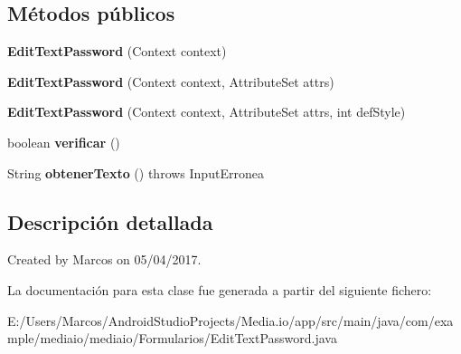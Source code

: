 \subsection*{Métodos públicos}
\begin{DoxyCompactItemize}
\item 
\mbox{\label{classcom_1_1example_1_1mediaio_1_1mediaio_1_1_formularios_1_1_edit_text_password_a96dba8342aa6e151d35646019243f469}} 
{\bfseries Edit\+Text\+Password} (Context context)
\item 
\mbox{\label{classcom_1_1example_1_1mediaio_1_1mediaio_1_1_formularios_1_1_edit_text_password_af9ffd043b33e50ac3d93371581ed385d}} 
{\bfseries Edit\+Text\+Password} (Context context, Attribute\+Set attrs)
\item 
\mbox{\label{classcom_1_1example_1_1mediaio_1_1mediaio_1_1_formularios_1_1_edit_text_password_ae43d621ba5454194869855f5fa6e4c6b}} 
{\bfseries Edit\+Text\+Password} (Context context, Attribute\+Set attrs, int def\+Style)
\item 
\mbox{\label{classcom_1_1example_1_1mediaio_1_1mediaio_1_1_formularios_1_1_edit_text_password_a4b2eab7bdbef01a1da4a79a4a68a34bf}} 
boolean {\bfseries verificar} ()
\item 
\mbox{\label{classcom_1_1example_1_1mediaio_1_1mediaio_1_1_formularios_1_1_edit_text_password_a363944d321bd3af5077d7dfd60263078}} 
String {\bfseries obtener\+Texto} ()  throws Input\+Erronea     
\end{DoxyCompactItemize}


\subsection{Descripción detallada}
Created by Marcos on 05/04/2017. 

La documentación para esta clase fue generada a partir del siguiente fichero\+:\begin{DoxyCompactItemize}
\item 
E\+:/\+Users/\+Marcos/\+Android\+Studio\+Projects/\+Media.\+io/app/src/main/java/com/example/mediaio/mediaio/\+Formularios/Edit\+Text\+Password.\+java\end{DoxyCompactItemize}
